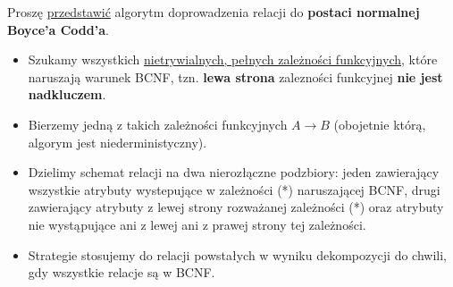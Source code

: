 \horrule{0.5pt}
Proszę \underline{przedstawić} algorytm doprowadzenia relacji do
\textbf{postaci normalnej Boyce’a Codd’a}.\\
\horrule{0.5pt}

\begin{itemize}
    \item Szukamy wszystkich \underline{nietrywialnych, pełnych zależności
    funkcyjnych}, które naruszają warunek BCNF, tzn.
    \textbf{lewa strona} zalezności funkcyjnej
    \textbf{nie jest nadkluczem}.
    \item Bierzemy jedną z takich zależności funkcyjnych $A \rightarrow B$
    (obojetnie którą, algorym jest niederministyczny).
    \item Dzielimy schemat relacji na dwa nierozłączne podzbiory:
    jeden zawierający wszystkie atrybuty wystepujące w zależności (*)
    naruszającej BCNF,
    drugi zawierający atrybuty z lewej strony rozważanej zależności
    (*) oraz atrybuty nie wystąpujące ani z lewej ani z prawej strony
    tej zależności.
    \item Strategie stosujemy do relacji powstałych w wyniku dekompozycji
    do chwili, gdy wszystkie relacje są w BCNF.
\end{itemize}
